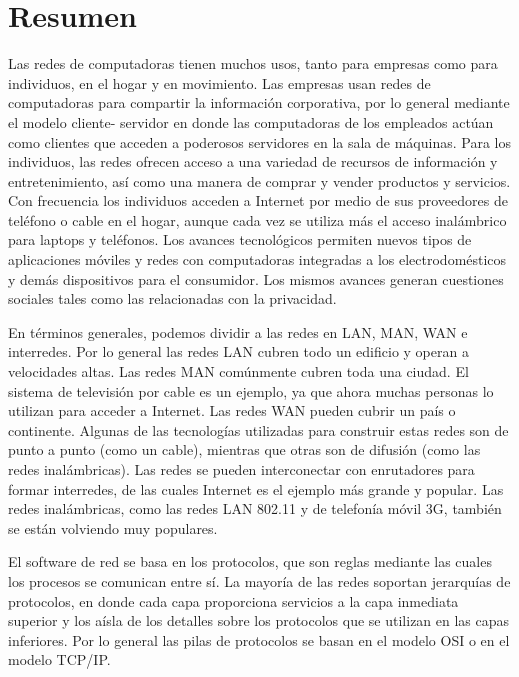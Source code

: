 \documentclass[10pt,a4paper]{report}
\begin{document}
\section{Resumen}

\par Las redes de computadoras tienen muchos usos, tanto para empresas como para 
individuos, en el hogar y en movimiento. Las empresas usan redes de computadoras 
para compartir la información corporativa, por lo general mediante el modelo cliente-
servidor en donde las computadoras de los empleados actúan como clientes que 
acceden a poderosos servidores en la sala de máquinas. Para los individuos, las redes 
ofrecen acceso a una variedad de recursos de información y entretenimiento, así como 
una manera de comprar y vender productos y servicios. Con frecuencia los individuos 
acceden a Internet por medio de sus proveedores de teléfono o cable en el hogar, 
aunque cada vez se utiliza más el acceso inalámbrico para laptops y teléfonos. Los 
avances tecnológicos permiten nuevos tipos de aplicaciones móviles y redes con 
computadoras integradas a los electrodomésticos y demás dispositivos para el 
consumidor. Los mismos avances generan cuestiones sociales tales como las 
relacionadas con la privacidad.
\par En términos generales, podemos dividir a las redes en LAN, MAN, WAN e 
interredes. Por lo general las redes LAN cubren todo un edificio y operan a velocidades 
altas. Las redes MAN comúnmente cubren toda una ciudad. El sistema de televisión 
por cable es un ejemplo, ya que ahora muchas personas lo utilizan para acceder a 
Internet. Las redes WAN pueden cubrir un país o continente. Algunas de las 
tecnologías utilizadas para construir estas redes son de punto a punto (como un 
cable), mientras que otras son de difusión (como las redes inalámbricas). Las redes se 
pueden interconectar con enrutadores para formar interredes, de las cuales Internet es 
el ejemplo más grande y popular. Las redes inalámbricas, como las redes LAN 802.11 
y de telefonía móvil 3G, también se están volviendo muy populares.
\par El software de red se basa en los protocolos, que son reglas mediante las cuales 
los procesos se comunican entre sí. La mayoría de las redes soportan jerarquías de 
protocolos, en donde cada capa proporciona servicios a la capa inmediata superior y 
los aísla de los detalles sobre los protocolos que se utilizan en las capas inferiores. Por 
lo general las pilas de protocolos se basan en el modelo OSI o en el modelo TCP/IP. 
\end{document}
